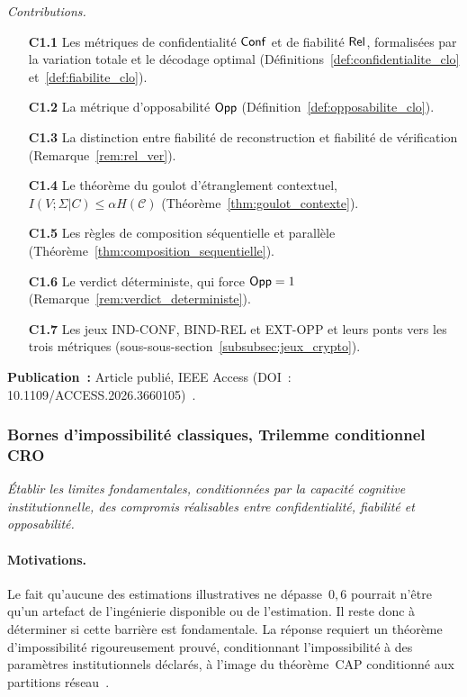 \begin{sloppypar}
\noindent\textit{Contributions.}
\begin{itemize}
  \item[\textbf{C1.1}] Les m\'etriques de confidentialit\'e $\mathsf{Conf}$ et de fiabilit\'e $\mathsf{Rel}$, formalis\'ees par la variation totale et le d\'ecodage optimal (D\'efinitions~\ref{def:confidentialite_clo} et~\ref{def:fiabilite_clo}).
  \item[\textbf{C1.2}] La m\'etrique d'opposabilit\'e $\mathsf{Opp}$ (D\'efinition~\ref{def:opposabilite_clo}).
  \item[\textbf{C1.3}] La distinction entre fiabilit\'e de reconstruction et fiabilit\'e de v\'erification (Remarque~\ref{rem:rel_ver}).
  \item[\textbf{C1.4}] Le th\'eor\`eme du goulot d'\'etranglement contextuel, $I(V;\Sigma|C) \leq \alpha H(\mathcal{C})$ (Th\'eor\`eme~\ref{thm:goulot_contexte}).
  \item[\textbf{C1.5}] Les r\`egles de composition s\'equentielle et parall\`ele (Th\'eor\`eme~\ref{thm:composition_sequentielle}).
  \item[\textbf{C1.6}] Le verdict d\'eterministe, qui force $\mathsf{Opp} = 1$ (Remarque~\ref{rem:verdict_deterministe}).
  \item[\textbf{C1.7}] Les jeux IND-CONF, BIND-REL et EXT-OPP et leurs ponts vers les trois m\'etriques (sous-sous-section~\ref{subsubsec:jeux_crypto}).
\end{itemize}

\textbf{Publication~:} Article publi\'e, IEEE Access
(DOI~: 10.1109/ACCESS.2026.3660105)~\cite{MINKA2026CLO}.

\subsubsection{Bornes d'impossibilit\'e classiques, Trilemme conditionnel CRO}
\label{subsubsec:obj2_cro}

\begin{objectif}\label{obj:obj2_impossibilite}
\textit{\'Etablir les limites fondamentales, conditionn\'ees par la capacit\'e cognitive institutionnelle, des compromis r\'ealisables entre confidentialit\'e, fiabilit\'e et opposabilit\'e.}
\end{objectif}

\paragraph{Motivations.}
Le fait qu'aucune des estimations illustratives ne d\'epasse~$0{,}6$ pourrait
n'\^etre qu'un artefact de l'ing\'enierie disponible ou de l'estimation. Il reste donc \`a d\'eterminer si cette barri\`ere
est fondamentale. La r\'eponse requiert un th\'eor\`eme d'impossibilit\'e
rigoureusement prouv\'e, conditionnant l'impossibilit\'e \`a des param\`etres
institutionnels d\'eclar\'es, \`a l'image du th\'eor\`eme~CAP conditionn\'e
aux partitions r\'eseau~\cite{GilbertLynch02,ChandraHadzilacos96}.


\end{sloppypar}

